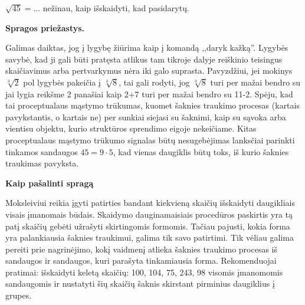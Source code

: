 \documentclass[a4paper]{article}
\begin{document}
$\sqrt{45}=$... nežinau, kaip išskaidyti, kad pasidarytų.

\textbf{Spragos priežastys.}

Galimas daiktas, jog į lygybę žiūrima kaip į komandą ,,daryk kažką''. Lygybės savybė, kad ji gali būti pratęsta atlikus tam tikroje dalyje reiškinio teisingus skaičiavimus arba pertvarkymus nėra iki galo suprasta. Pavyzdžiui, jei mokinys $\sqrt[3]{2}$ pol lygybės pakeičia į $\sqrt[3]{8}$, tai gali rodyti, jog $\sqrt[3]{8}$ turi per mažai bendro su jai lygia reikšme 2 panašiai kaip 2+7 turi per mažai bendro su 11-2. Spėju, kad tai proceptualaus mąstymo trūkumas, kuomet šaknies traukimo procesas (kartais pavykstantis, o kartais ne) per sunkiai siejasi su šaknimi, kaip su sąvoka arba vientisu objektu, kurio struktūros sprendimo eigoje nekeičiame.  Kitas proceptualaus mąstymo trūkumo signalas būtų nesugebėjimas lanksčiai parinkti tinkamos sandaugos $45=9\cdot 5$, kad vienas daugiklis būtų toks, iš kurio šaknies traukimas pavyksta. 

\textbf{Kaip pašalinti spragą} 

Moksleiviui reikia įgyti patirties bandant kiekvieną skaičių išskaidyti daugikliais visais įmanomais būdais. Skaidymo dauginamaisiais procedūros paskirtis yra tą patį skaičių gebėti užrašyti skirtingomis formomis. Tačiau pajusti, kokia forma yra palankiausia šaknies traukimui, galima tik savo patirtimi. Tik vėliau galima pereiti prie nagrinėjimo, kokį vaidmenį atlieka šaknies traukimo procesas iš sandaugos ir sandaugos, kuri parašyta tinkamiausia forma. Rekomenduojai pratimai: išskaidyti keletą skaičių: 100, 104, 75, 243, 98 visomis įmanomomis sandaugomis ir nustatyti šių skaičių šaknis skirstant pirminius daugiklius į grupes.
\end{document}
